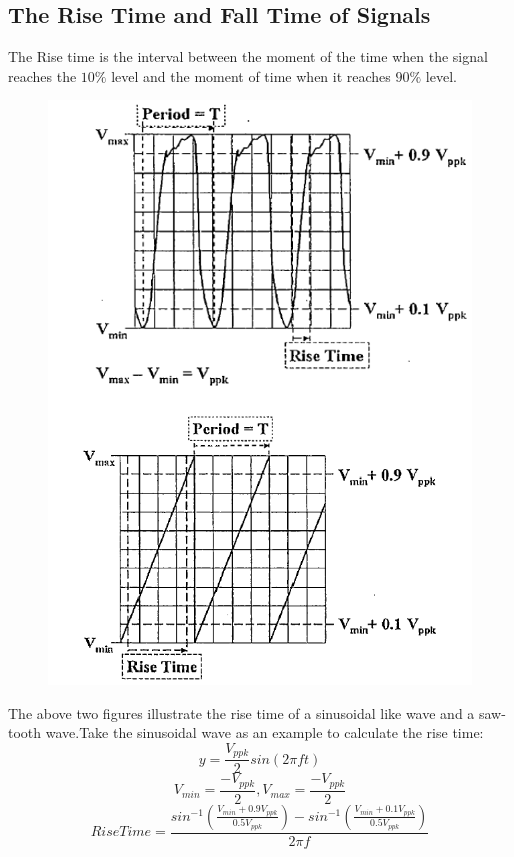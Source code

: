\documentclass[12pt]{article}
\begin{document}
\subsection{The Rise Time and Fall Time of Signals}
The Rise time is the interval between the moment of the time when the signal reaches the $10\%$ level and the moment of time when it reaches $90\%$ level.
\begin{figure}[H]
\centering
\includegraphics[scale=0.5]{P2.jpg}
\end{figure} 
\par The above two figures illustrate the rise time of a sinusoidal like wave and a saw-tooth wave.Take the sinusoidal wave as an example to calculate the rise time:
$$y=\frac{V_{ppk}}{2}sin(2\pi ft)$$
$$V_{min}=\frac{-V_{ppk}}{2},V_{max}=\frac{-V_{ppk}}{2}$$
$$RiseTime=\frac{sin^{-1}(\frac{V_{min}+0.9V_{ppk}}{0.5V_{ppk}})-sin^{-1}(\frac{V_{min}+0.1V_{ppk}}{0.5V_{ppk}})}{2\pi f}$$
\end{document}
